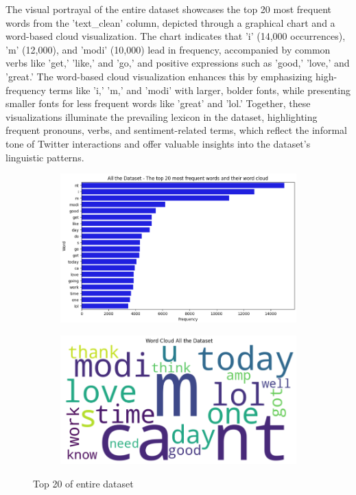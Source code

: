 The visual portrayal of the entire dataset showcases the top 20 most frequent words from the 'text\_clean' column, depicted through a graphical chart and a word-based cloud visualization. The chart indicates that 'i' (14,000 occurrences), 'm' (12,000), and 'modi' (10,000) lead in frequency, accompanied by common verbs like 'get,' 'like,' and 'go,' and positive expressions such as 'good,' 'love,' and 'great.' The word-based cloud visualization enhances this by emphasizing high-frequency terms like 'i,' 'm,' and 'modi' with larger, bolder fonts, while presenting smaller fonts for less frequent words like 'great' and 'lol.' Together, these visualizations illuminate the prevailing lexicon in the dataset, highlighting frequent pronouns, verbs, and sentiment-related terms, which reflect the informal tone of Twitter interactions and offer valuable insights into the dataset’s linguistic patterns.

\begin{figure}[H]
    \centering
    \begin{subfigure}[b]{0.48\textwidth}
        \includegraphics[width=\textwidth]{img/visualize_pic/top20.png}
    \end{subfigure}
    \begin{subfigure}[b]{0.48\textwidth}
        \includegraphics[width=\textwidth]{img/visualize_pic/top20_word_cloud.png}
    \end{subfigure}
    \caption{Top 20 of entire dataset}
\end{figure}

